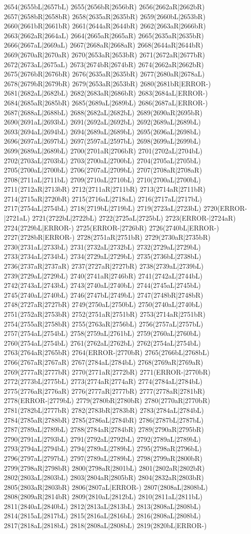 2654(2655bL|2657bL) 2655(2656bR|2656bR) 2656(2662aR|2662bR) 2657(2658bR|2658bR) 2658(2635aR|2635bR) 2659(2660bL|2653bR) 2660(2661bR|2661bR) 2661(2644aR|2644bR) 2662(2663aR|2666bR) 2663(2662aR|2664aL) 2664(2665aR|2665aR) 2665(2635aR|2635bR) 2666(2667aL|2669aL) 2667(2668aR|2668aR) 2668(2644aR|2644bR) 2669(2670aR|2670aR) 2670(2653aR|2653bR) 2671(2672aR|2677bR) 2672(2673aL|2675aL) 2673(2674bR|2674bR) 2674(2662aR|2662bR) 2675(2676bR|2676bR) 2676(2635aR|2635bR) 2677(2680aR|2678aL) 2678(2679bR|2679bR) 2679(2653aR|2653bR) 2680(2681bR|ERROR-) 2681(2682aL|2682bL) 2682(2683aR|2686bR) 2683(2684aL|ERROR-) 2684(2685aR|2685bR) 2685(2689aL|2689bL) 2686(2687aL|ERROR-) 2687(2688aL|2688bL) 2688(2682aL|2682bL) 2689(2690aR|2695bR) 2690(2691aL|2693bL) 2691(2692aL|2692bL) 2692(2689aL|2689bL) 2693(2694aL|2694bL) 2694(2689aL|2689bL) 2695(2696aL|2698bL) 2696(2697aL|2697bL) 2697(2597aL|2597bL) 2698(2699aL|2699bL) 2699(2689aL|2689bL) 2700(2701aR|2706bR) 2701(2702aL|2704bL) 2702(2703aL|2703bL) 2703(2700aL|2700bL) 2704(2705aL|2705bL) 2705(2700aL|2700bL) 2706(2707aL|2709bL) 2707(2708aR|2708aR) 2708(2711aL|2711bL) 2709(2710aL|2710bL) 2710(2700aL|2700bL) 2711(2712aR|2713bR) 2712(2711aR|2711bR) 2713(2714aR|2711bR) 2714(2715aR|2720bR) 2715(2716aL|2718aL) 2716(2717aL|2717bL) 2717(2754aL|2754bL) 2718(2719bL|2719bL) 2719(2723aL|2723bL) 2720(ERROR-|2721aL) 2721(2722bL|2722bL) 2722(2725aL|2725bL) 2723(ERROR-|2724aR) 2724(2729bL|ERROR-) 2725(ERROR-|2726bR) 2726(2740bL|ERROR-) 2727(2728bR|ERROR-) 2728(2751aR|2751bR) 2729(2730aR|2735bR) 2730(2731aL|2733bL) 2731(2732aL|2732bL) 2732(2729aL|2729bL) 2733(2734aL|2734bL) 2734(2729aL|2729bL) 2735(2736bL|2738bL) 2736(2737aR|2737aR) 2737(2727aR|2727bR) 2738(2739aL|2739bL) 2739(2729aL|2729bL) 2740(2741aR|2746bR) 2741(2742aL|2744bL) 2742(2743aL|2743bL) 2743(2740aL|2740bL) 2744(2745aL|2745bL) 2745(2740aL|2740bL) 2746(2747bL|2749bL) 2747(2748bR|2748bR) 2748(2727aR|2727bR) 2749(2750aL|2750bL) 2750(2740aL|2740bL) 2751(2752aR|2753bR) 2752(2751aR|2751bR) 2753(2714aR|2751bR) 2754(2755aR|2758bR) 2755(2763aR|2756bL) 2756(2757aL|2757bL) 2757(2754aL|2754bL) 2758(2759aL|2761bL) 2759(2760aL|2760bL) 2760(2754aL|2754bL) 2761(2762aL|2762bL) 2762(2754aL|2754bL) 2763(2764aR|2765bR) 2764(ERROR-|2770bR) 2765(2766bL|2768bL) 2766(2767aR|2767aR) 2767(2784aL|2784bL) 2768(2769aR|2769aR) 2769(2777aR|2777bR) 2770(2771aR|2772bR) 2771(ERROR-|2770bR) 2772(2773bL|2775bL) 2773(2774aR|2774aR) 2774(2784aL|2784bL) 2775(2776aR|2776aR) 2776(2777aR|2777bR) 2777(2778aR|2781bR) 2778(ERROR-|2779bL) 2779(2780bR|2780bR) 2780(2770aR|2770bR) 2781(2782bL|2777bR) 2782(2783bR|2783bR) 2783(2784aL|2784bL) 2784(2785aR|2788bR) 2785(2786aL|2784bR) 2786(2787bL|2787bL) 2787(2789aL|2789bL) 2788(2784aR|2784bR) 2789(2790aR|2795bR) 2790(2791aL|2793bL) 2791(2792aL|2792bL) 2792(2789aL|2789bL) 2793(2794aL|2794bL) 2794(2789aL|2789bL) 2795(2798aR|2796bL) 2796(2797aL|2797bL) 2797(2789aL|2789bL) 2798(2799aR|2800bR) 2799(2798aR|2798bR) 2800(2798aR|2801bL) 2801(2802aR|2802bR) 2802(2803aL|2803bL) 2803(2804aR|2805bR) 2804(2832aR|2803bR) 2805(2803aR|2803bR) 2806(2807aL|ERROR-) 2807(2808aL|2808bL) 2808(2809aR|2814bR) 2809(2810aL|2812bL) 2810(2811aL|2811bL) 2811(2840aL|2840bL) 2812(2813aL|2813bL) 2813(2808aL|2808bL) 2814(2815aL|2817bL) 2815(2816aL|2816bL) 2816(2808aL|2808bL) 2817(2818aL|2818bL) 2818(2808aL|2808bL) 2819(2820bL|ERROR-) 